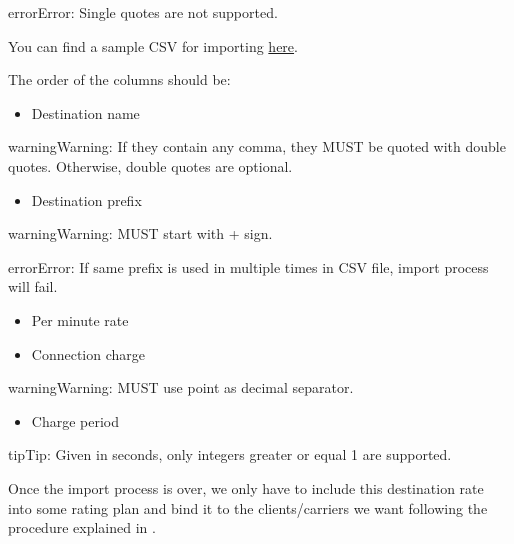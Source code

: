 \documentclass[letterpaper,10pt,english]{sphinxmanual}
\begin{document}
\begin{notice}{error}{Error:}
Single quotes are not supported.
\end{notice}

You can find a sample CSV for importing \href{https://raw.githubusercontent.com/irontec/ivozprovider/artemis/web/admin/samples/pricesSample.csv}{here}.

The order of the columns should be:
\begin{itemize}
\item {} 
Destination name

\end{itemize}

\begin{notice}{warning}{Warning:}
If they contain any comma, they MUST be quoted with double quotes. Otherwise, double quotes are optional.
\end{notice}
\begin{itemize}
\item {} 
Destination prefix

\end{itemize}

\begin{notice}{warning}{Warning:}
MUST start with + sign.
\end{notice}

\begin{notice}{error}{Error:}
If same prefix is used in multiple times in CSV file, import process will fail.
\end{notice}
\begin{itemize}
\item {} 
Per minute rate

\item {} 
Connection charge

\end{itemize}

\begin{notice}{warning}{Warning:}
MUST use point as decimal separator.
\end{notice}
\begin{itemize}
\item {} 
Charge period

\end{itemize}

\begin{notice}{tip}{Tip:}
Given in seconds, only integers greater or equal 1 are supported.
\end{notice}

Once the import process is over, we only have to include this destination rate into some
rating plan and bind it to the clients/carriers we want following the procedure explained in
{\hyperref[administration_portal/brand/billing/rating_plans:rating\string-plans]{}}.
\end{document}
